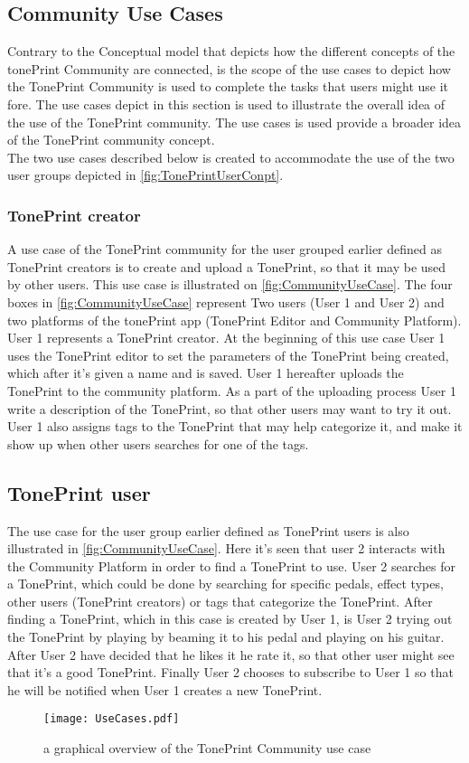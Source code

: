 \subsection{Community Use Cases}
\label{CommunityUseCases}
Contrary to the Conceptual model that depicts how the different concepts of the tonePrint Community are connected, is the scope of the use cases to depict how the TonePrint Community is used to complete the tasks that users might use it fore. The use cases depict in this section is used to illustrate the overall idea of the use of the TonePrint community. The use cases is used provide a broader idea of the TonePrint community concept.\\
The two use cases described below is created to accommodate the use of the two user groups depicted in \autoref{fig:TonePrintUserConpt}.

\subsubsection*{TonePrint creator}
\label{UseCase1}
%
A use case of the TonePrint community for the user grouped earlier defined as TonePrint creators is to create and upload a TonePrint, so that it may be used by other users. This use case is illustrated on \autoref{fig:CommunityUseCase}. The four boxes in \autoref{fig:CommunityUseCase} represent Two users (User 1 and User 2) and two platforms of the tonePrint app (TonePrint Editor and Community Platform). User 1 represents a TonePrint creator. At the beginning of this use case User 1 uses the TonePrint editor to set the parameters of the TonePrint being created, which after it's given a name and is saved. User 1 hereafter uploads the TonePrint to the community platform. As a part of the uploading process User 1 write a description of the TonePrint, so that other users may want to try it out. User 1 also assigns tags to the TonePrint that may help categorize it, and make it show up when other users searches for one of the tags. 

\subsection*{TonePrint user}
\label{UseCase2}
%
The use case for the user group earlier defined as TonePrint users is also illustrated in \autoref{fig:CommunityUseCase}. Here it's seen that user 2 interacts with the Community Platform in order to find a TonePrint to use. User 2 searches for a TonePrint, which could be done by searching for specific pedals, effect types, other users (TonePrint creators) or tags that categorize the TonePrint. After finding a TonePrint, which in this case is created by User 1, is User 2 trying out the TonePrint by playing by beaming it to his pedal and playing on his guitar. After User 2 have decided that he likes it he rate it, so that other user might see that it's a good TonePrint. Finally User 2 chooses to subscribe to User 1 so that he will be notified when User 1 creates a new TonePrint.


\begin{figure}[H]
	\centering
	\texttt{[image: UseCases.pdf]}
	\caption{a graphical overview of the TonePrint Community use case}
	\label{fig:CommunityUseCase}
\end{figure}